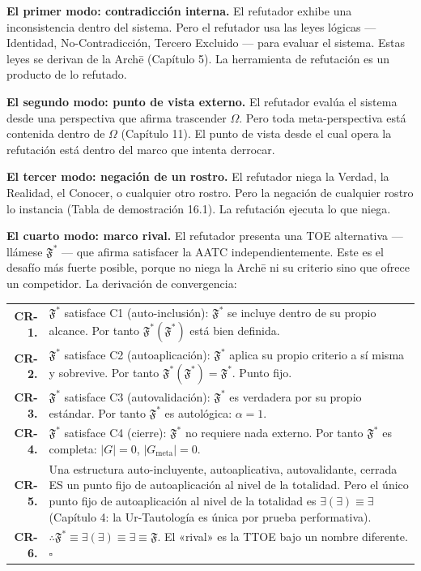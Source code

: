 \documentclass[10pt, openany, oneside]{book}
\renewcommand{\footnotesize}{\fontsize{8.5}{11}\selectfont}
\begin{document}
\textbf{El primer modo: contradicción interna.} El refutador exhibe una inconsistencia dentro del sistema. Pero el refutador usa las leyes lógicas --- Identidad, No-Contradicción, Tercero Excluido --- para evaluar el sistema. Estas leyes se derivan de la Arch\={e} (Capítulo 5). La herramienta de refutación es un producto de lo refutado.

\textbf{El segundo modo: punto de vista externo.} El refutador evalúa el sistema desde una perspectiva que afirma trascender $\Omega$. Pero toda meta-perspectiva está contenida dentro de $\Omega$ (Capítulo 11). El punto de vista desde el cual opera la refutación está dentro del marco que intenta derrocar.

\textbf{El tercer modo: negación de un rostro.} El refutador niega la Verdad, la Realidad, el Conocer, o cualquier otro rostro. Pero la negación de cualquier rostro lo instancia (Tabla de demostración 16.1). La refutación ejecuta lo que niega.

\textbf{El cuarto modo: marco rival.} El refutador presenta una TOE alternativa --- llámese $\mathfrak{F}^*$ --- que afirma satisfacer la AATC independientemente. Este es el desafío más fuerte posible, porque no niega la Arch\={e} ni su criterio sino que ofrece un competidor. La derivación de convergencia:

\vspace{0.5em}

{\footnotesize
\noindent\begin{tabular}{r p{}}
\textbf{CR-1.} & $\mathfrak{F}^*$ satisface C1 (auto-inclusión): $\mathfrak{F}^*$ se incluye dentro de su propio alcance. Por tanto $\mathfrak{F}^*(\mathfrak{F}^*)$ está bien definida. \\[0.3em]
\textbf{CR-2.} & $\mathfrak{F}^*$ satisface C2 (autoaplicación): $\mathfrak{F}^*$ aplica su propio criterio a sí misma y sobrevive. Por tanto $\mathfrak{F}^*(\mathfrak{F}^*) = \mathfrak{F}^*$. Punto fijo. \\[0.3em]
\textbf{CR-3.} & $\mathfrak{F}^*$ satisface C3 (autovalidación): $\mathfrak{F}^*$ es verdadera por su propio estándar. Por tanto $\mathfrak{F}^*$ es autológica: $\alpha = 1$. \\[0.3em]
\textbf{CR-4.} & $\mathfrak{F}^*$ satisface C4 (cierre): $\mathfrak{F}^*$ no requiere nada externo. Por tanto $\mathfrak{F}^*$ es completa: $|G| = 0$, $|G_{\text{meta}}| = 0$. \\[0.3em]
\textbf{CR-5.} & Una estructura auto-incluyente, autoaplicativa, autovalidante, cerrada ES un punto fijo de autoaplicación al nivel de la totalidad. Pero el único punto fijo de autoaplicación al nivel de la totalidad es $\exists(\exists) \equiv \exists$ (Capítulo 4: la Ur-Tautología es única por prueba performativa). \\[0.3em]
\textbf{CR-6.} & $\therefore \mathfrak{F}^* \equiv \exists(\exists) \equiv \exists \equiv \mathfrak{F}$. El «rival» es la TTOE bajo un nombre diferente. $\square$ \\[0.3em]
\end{tabular}
}
\end{document}
